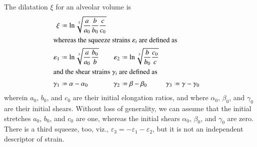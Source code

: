 The dilatation $\xi$ for an alveolar volume is
\begin{subequations}
    \begin{align}
    \mathrm  \xi & \defeq \ln \sqrt[3]{\frac{a}{a_0}
        \frac{b}{b_0} \frac{c}{c_0}} \\
    \intertext{whereas the squeeze strains $\varepsilon_i$ are defined as}
    \varepsilon_1 & \defeq \ln \sqrt[3]{\frac{a}
        {a_0} \frac{b_0}{b}} & 
    \varepsilon_2 & \defeq \ln \sqrt[3]{\frac{b}
    {b_0} \frac{c_0}{c}}  \\
    \intertext{and the shear strains $\gamma_i$ are defined as}
    \gamma_1 & \defeq \alpha - \alpha_0 &
    \gamma_2 & \defeq \beta - \beta_0 &
    \gamma_3 & \defeq \gamma - \gamma_0
    \end{align}
\end{subequations}
wherein $a_0$, $b_0$, and $c_0$ are their initial elongation ratios, and where $\alpha_0$, $\beta_0$, and $\gamma_0$ are their initial shears. Without loss of generality, we can assume that the initial stretches $a_0$, $b_0$, and $c_0$ are one, whereas the initial shears $\alpha_0$, $\beta_0$, and $\gamma_0$ are zero. There is a third squeeze, too, viz., $\varepsilon_3 = -\varepsilon_1 - \varepsilon_2$, but it is not an independent descriptor of strain.


